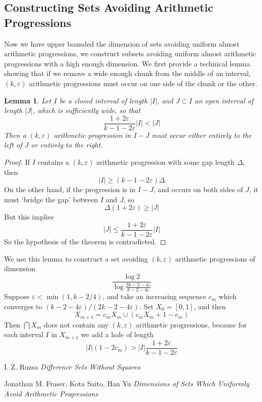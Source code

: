 \documentclass{article}
\theoremstyle{plain}
\newtheorem{lemma}{Lemma}
\theoremstyle{plain}
\begin{document}
\subsection{Constructing Sets Avoiding Arithmetic Progressions}

Now we have upper bounded the dimension of sets avoiding uniform almost arithmetic progressions, we construct subsets avoiding uniform almost arithmetic progressions with a high enough dimension. We first provide a technical lemma showing that if we remove a wide enough chunk from the middle of an interval, $(k,\varepsilon)$ arithmetic progressions must occur on one side of the chunk or the other.

\begin{lemma}
    Let $I$ be a closed interval of length $|I|$, and $J \subset I$ an open interval of length $|J|$, which is sufficiently wide, so that
    \[ \frac{1 + 2 \varepsilon}{k - 1 - 2\varepsilon} |I| < |J| \]
    Then a $(k,\varepsilon)$ arithmetic progression in $I - J$ must occur either entirely to the left of $J$ or entirely to the right.
\end{lemma}
\begin{proof}
    If $I$ contains a $(k,\varepsilon)$ arithmetic progression with some gap length $\Delta$, then
    \[ |I| \geq (k - 1 - 2\varepsilon) \Delta \]
    On the other hand, if the progression is in $I - J$, and occurs on both sides of $J$, it must `bridge the gap' between $I$ and $J$, so
    \[ \Delta (1 + 2\varepsilon) \geq |J| \]
    But this implies
    \[ |J| \leq \frac{1 + 2 \varepsilon}{k - 1 - 2 \varepsilon} |I| \]
    So the hypothesis of the theorem is contradicted.
\end{proof}

We use this lemma to construct a set avoiding $(k,\varepsilon)$ arithmetic progressions of dimension
%
\[ \frac{\log 2}{\log \frac{2k - 2 - 4\varepsilon}{k - 2 - 4\varepsilon}} \]
%
Suppose $\varepsilon < \min(1, k-2/4)$, and take an increasing sequence $c_m$ which converges to $(k-2-4\varepsilon)/(2k - 2 - 4\varepsilon)$. Set $X_0 = [0,1]$, and then
%
\[ X_{m+1} = c_m X_m \cup (c_m X_m + 1 - c_m) \]
%
Then $\bigcap X_m$ does not contain any $(k,\varepsilon)$ arithmetic progressions, because for each interval $I$ in $X_{m+1}$ we add a hole of length
%
\[ |I|(1 - 2c_m) > |I| \frac{1 + 2 \varepsilon}{k - 1 - 2 \varepsilon} \]

\begin{thebibliography}{9}

I. Z. Ruzsa
\textit{Difference Sets Without Squares}

Jonathan M. Fraser, Kota Saito, Han Yu
\textit{Dimensions of Sets Which Uniformly Avoid Arithmetic Progressions}

\end{thebibliography}
\end{document}
